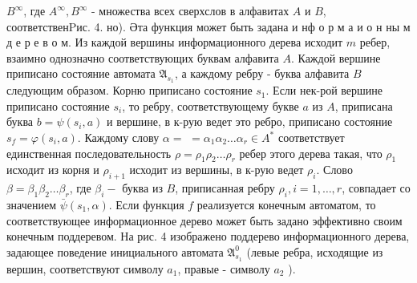 \documentclass[10pt]{article}
\begin{document}
$B^{\infty}$, где $A^{\infty}, B^{\infty}$ - множества всех сверхслов в алфавитах $A$ и $B$, соответственPис. 4. но). Әта функция может быть задана и нф о р м а и о н ны м д е р е в о м. Из каждой вершины информационного дерева исходит $m$ ребер, взаимно однозначно соответствующих буквам алфавита $A$. Каждой вершине приписано состояние автомата $\mathfrak{A}_{s_{1}}$, а каждому ребру - буква алфавита $B$ следующим образом. Корню приписано состояние $s_{1}$. Если нек-рой вершине приписано состояние $s_{i}$, то ребру, соответствующему букве $a$ из $A$, приписана буква $b=\psi\left(s_{i}, a\right)$ и вершине, в к-рую ведет это ребро, приписано состояние $s_{f}=\varphi\left(s_{i}, a\right)$. Каждому слову $\alpha=$ $=\alpha_{1} \alpha_{2} \ldots \alpha_{r} \in A^{*}$ соответствует единственная последовательность $\rho=\rho_{1} \rho_{2} \ldots \rho_{r}$ ребер этого дерева такая, что $\rho_{1}$ исходит из корня и $\rho_{i+1}$ исходит из вершины, в к-рую ведет $\rho_{i}$. Слово $\beta=\beta_{1} \beta_{2} \ldots \beta_{r}$, где $\beta_{i}-$ буква из $B$, приписанная ребру $\rho_{i}, i=1, \ldots, r$, совпадает со значением $\bar{\psi}\left(s_{1}, \alpha\right)$. Если функция $f$ реализуется конечным автоматом, то соответствующее информационное дерево может быть задано эффективно своим конечным поддеревом. На рис. 4 изображено поддерево информационного дерева, задающее поведение инициального автомата $\mathfrak{A}_{s_{1}}^{0}$ (левые ребра, исходящие из вершин, соответствуют символу $a_{1}$, правые - символу $a_{2}$ ).
\end{document}
